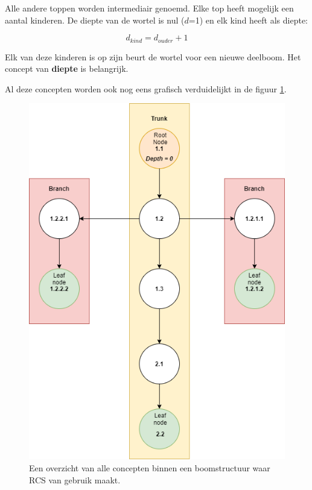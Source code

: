 Alle andere toppen worden intermediair genoemd. Elke top heeft mogelijk een aantal kinderen. De diepte van de wortel is nul ($d$=1) en elk kind heeft als diepte: 

\begin{equation}
	d_{kind} = d_{ouder} + 1
\end{equation}

Elk van deze kinderen is op zijn beurt de wortel voor een nieuwe deelboom. Het concept van \textbf{diepte} is belangrijk. 

Al deze concepten worden ook nog eens grafisch verduidelijkt in de figuur \ref{fig_tree}.

\begin{figure}[h!]
\centering
\includegraphics[scale=0.5]{tree1.png}
\caption[Overzicht concepten boomstructuur]{Een overzicht van alle concepten binnen een boomstructuur waar RCS van gebruik maakt.}\label{fig_tree}
\end{figure}

